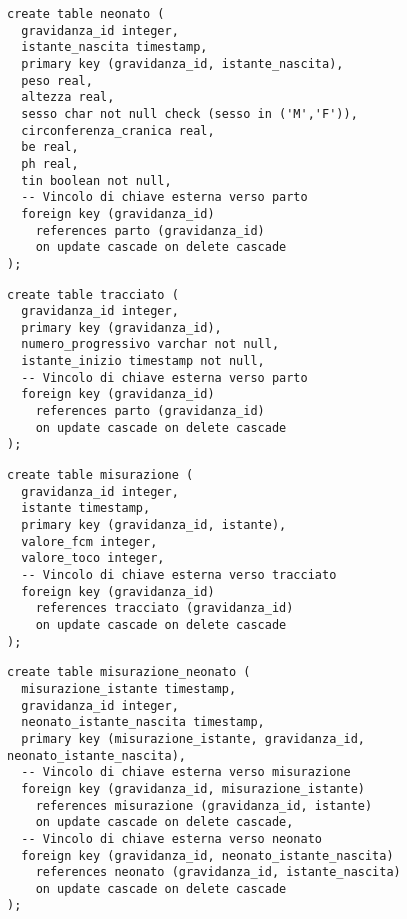 \begin{lstlisting}[float,caption={Definizione della tabella \tab{neonato}.},label=ptabneonato]
create table neonato (
  gravidanza_id integer,
  istante_nascita timestamp,
  primary key (gravidanza_id, istante_nascita),
  peso real,
  altezza real,
  sesso char not null check (sesso in ('M','F')),
  circonferenza_cranica real,
  be real,
  ph real,
  tin boolean not null,
  -- Vincolo di chiave esterna verso parto
  foreign key (gravidanza_id)
    references parto (gravidanza_id)
    on update cascade on delete cascade
);
\end{lstlisting}

\begin{lstlisting}[float,caption={Definizione della tabella \tab{tracciato}.},label=ptabtracciato]
create table tracciato (
  gravidanza_id integer,
  primary key (gravidanza_id),
  numero_progressivo varchar not null,
  istante_inizio timestamp not null,
  -- Vincolo di chiave esterna verso parto
  foreign key (gravidanza_id)
    references parto (gravidanza_id)
    on update cascade on delete cascade
);
\end{lstlisting}

\begin{lstlisting}[float,caption={Definizione della tabella \tab{misurazione}.},label=ptabmisurazione]
create table misurazione (
  gravidanza_id integer,
  istante timestamp,
  primary key (gravidanza_id, istante),
  valore_fcm integer,
  valore_toco integer,
  -- Vincolo di chiave esterna verso tracciato
  foreign key (gravidanza_id)
    references tracciato (gravidanza_id)
    on update cascade on delete cascade
);
\end{lstlisting}

\begin{lstlisting}[float,caption={Definizione della tabella \tab{misurazione\_neonato}.},label=ptabmisurazioneneonato]
create table misurazione_neonato (
  misurazione_istante timestamp,
  gravidanza_id integer,
  neonato_istante_nascita timestamp,
  primary key (misurazione_istante, gravidanza_id, neonato_istante_nascita),
  -- Vincolo di chiave esterna verso misurazione
  foreign key (gravidanza_id, misurazione_istante)
    references misurazione (gravidanza_id, istante)
    on update cascade on delete cascade,
  -- Vincolo di chiave esterna verso neonato
  foreign key (gravidanza_id, neonato_istante_nascita)
    references neonato (gravidanza_id, istante_nascita)
    on update cascade on delete cascade
);
\end{lstlisting}


